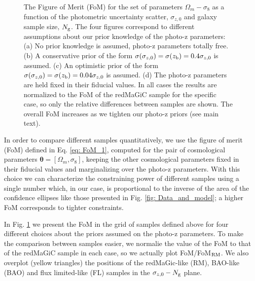 \documentclass[a4paper,fleqn,usenatbib]{mnras}
\begin{document}
\begin{figure*}
\centering
{}%

\caption{The Figure of Merit (FoM) for the set of parameters $\Omega_m - \sigma_8$ as a function of the photometric uncertainty scatter, $\sigma_{z,0}$ and galaxy sample size, $N_{\mbox{\scriptsize{g}}}$. The four figures correspond to different assumptions about our prior knowledge of the photo-z parameters: (a) No prior knowledge is assumed, photo-z parameters totally free. (b) A conservative prior of the form $\sigma(\sigma_{z,0}) = \sigma(z_{\mbox{\scriptsize{b}}}) = 0.4\sigma_{z,0}$ is assumed. (c) An optimistic prior of the form $\sigma(\sigma_{z,0}) = \sigma(z_{\mbox{\scriptsize{b}}}) = 0.04\sigma_{z,0}$ is assumed. (d) The photo-z parameters are held fixed in their fiducial values. In all cases the results are normalized to the FoM of the redMaGiC sample for the specific case, so only the relative differences between samples are shown. The overall FoM increases as we tighten our photo-z  priors (see main text).}
\label{fig: Baseline}
\end{figure*}

In order to compare different samples quantitatively, we use the figure of merit (FoM) defined in Eq. \eqref{eq: FoM_1}, computed for the pair of cosmological parameters $\mathbf{\theta} =[ \Omega_m, \sigma_8]$, keeping the other cosmological parameters fixed in their fiducial values and marginalizing over the photo-z parameters. With this choice we can characterize the constraining power of different samples using a single number which, in our case, is proportional to the inverse of the area of the confidence ellipses like those presented in Fig. \ref{fig: Data_and_model}; a higher FoM corresponds to tighter constraints.

In Fig. \ref{fig: Baseline} we present the FoM in the grid of samples defined above for four different choices about the priors assumed on the photo-z parameters. To make the comparison between samples easier, we normalie the value of the FoM to that of the redMaGiC sample in each case, so we actually plot FoM/FoM$_{\mbox{\scriptsize{RM}}}$. We also overplot (yellow triangles) the positions of the redMaGic-like (RM), BAO-like (BAO) and flux limited-like (FL) samples in the $\sigma_{z,0} - N_{\mbox{\scriptsize{g}}} $ plane. 
\end{document}
